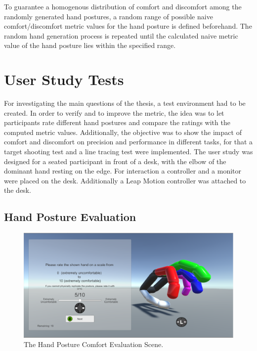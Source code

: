 To guarantee a homogenous distribution of comfort and discomfort among the randomly generated hand postures, a random range of possible naive comfort/discomfort metric values for the hand posture is defined beforehand. The random hand generation process is repeated until the calculated naive metric value of the hand posture lies within the specified range.

\section{User Study Tests}

For investigating the main questions of the thesis, a test environment had to be created. In order to verify and to improve the metric, the idea was to let participants rate different hand postures and compare the ratings with the computed metric values. Additionally, the objective was to show the impact of comfort and discomfort on precision and performance in different tasks, for that a target shooting test and a line tracing test were implemented.
The user study was designed for a seated participant in front of a desk, with the elbow of the dominant hand resting on the edge. For interaction a controller and a monitor were placed on the desk. Additionally a Leap Motion controller was attached to the desk.  

\subsection{Hand Posture Evaluation}


\begin{figure}
\centering
\includegraphics[width=\textwidth]{evaluation}
\caption{The Hand Posture Comfort Evaluation Scene.}
\label{fig:evaluation}
\end{figure}


